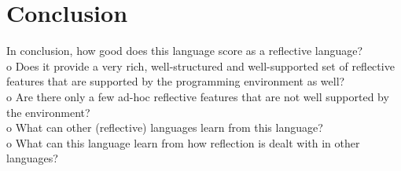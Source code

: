 \section{Conclusion}
	In conclusion, how good does this language score as a reflective language?\\
o	Does it provide a very rich, well-structured and well-supported set of reflective features that are supported by the programming environment as well?\\
o	Are there only a few ad-hoc reflective features that are not well supported by the environment?\\
o	What can other (reflective) languages learn from this language?\\
o	What can this language learn from how reflection is dealt with in other languages?\\